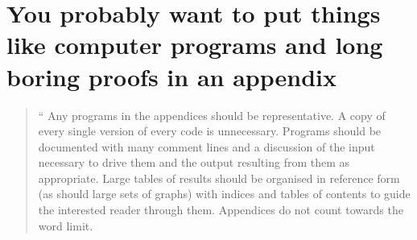 \documentclass[11pt,a4,twosided,singlespacing,titlepagenumber=on]{scrreprt}
\numberwithin{equation}{chapter} %
\theoremstyle{remark}
\newenvironment{myquote}%
{\begin{quote}{\Large{}``}}%
{\ifhmode\unskip\fi{\Large{}''}\end{quote}}
\begin{document}
\cleardoublepage
{}
{} %


\appendix %

\chapter{You probably want to put things like computer programs and long boring proofs in an appendix}
\begin{myquote}
Any programs in the appendices should be representative. A copy of every single version of every code
is unnecessary. Programs should be documented with many comment lines and a discussion of the input
necessary to drive them and the output resulting from them as appropriate. Large tables of results should
be organised in reference form (as should large sets of graphs) with indices and tables of contents to guide
the interested reader through them. Appendices do not count towards the word limit.
\end{myquote}
\end{document}

